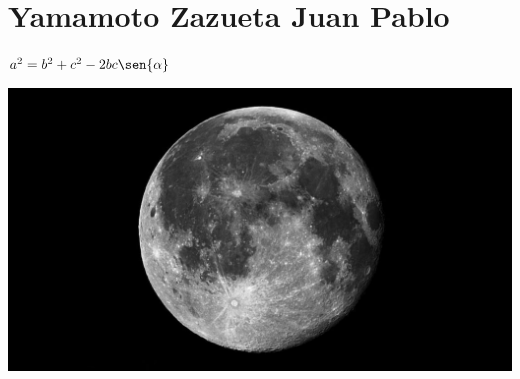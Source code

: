 \chapter{Yamamoto Zazueta Juan Pablo}

$a^{2}=b^{2}+c^{2}-2bc\sen{\alpha}$

\includegraphics[scale=0.5]{./420002457/imagen.jpg}


